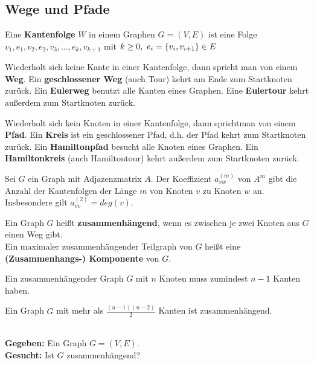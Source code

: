 	\subsection{Wege und Pfade}
	\begin{definition}[Kantenfolge]
		Eine \textbf{Kantenfolge} $W$ in einem Graphen $G = (V, E)$ ist eine Folge $v_1, e_1, v_2, e_2, v_3, ..., e_k, v_{k+1}$ mit $k \ge 0,~e_i = \{v_i, v_{i+1}\} \in E$
	\end{definition}
	\begin{definition}[Weg]
		Wiederholt sich keine Kante in einer Kantenfolge, dann spricht man von einem \textbf{Weg}. Ein \textbf{geschlossener Weg} (auch Tour) kehrt am Ende zum Startknoten zurück. Ein \textbf{Eulerweg} benutzt alle Kanten eines Graphen. Eine \textbf{Eulertour} kehrt außerdem zum Startknoten zurück.
	\end{definition}
	\begin{definition}[Pfad]
		Wiederholt sich kein Knoten in einer Kantenfolge, dann sprichtman von einem \textbf{Pfad}. Ein \textbf{Kreis} ist ein geschlossener Pfad, d.h. der Pfad kehrt zum Startknoten zurück. Ein \textbf{Hamiltonpfad} besucht alle Knoten eines Graphen. Ein \textbf{Hamiltonkreis} (auch Hamiltontour) kehrt außerdem zum Startknoten zurück.
	\end{definition}
	\begin{satz}
		Sei $G$ ein Graph mit Adjazenzmatrix $A$. Der Koeffizient $a_{vw}^{(m)}$ von $A^m$ gibt die Anzahl der Kantenfolgen der Länge $m$ von Knoten $v$ zu Knoten $w$ an. Insbesondere gilt $a_{vv}^{(2)} = deg(v)$.
	\end{satz}
	\begin{definition}[Zusammenhängend]
		Ein Graph $G$ heißt \textbf{zusammenhängend}, wenn es zwischen je zwei Knoten aus $G$ einen Weg gibt.\\[5pt]
		Ein maximaler zusammenhängender Teilgraph von $G$ heißt eine \textbf{(Zusammenhangs-) Komponente} von $G$.
	\end{definition}
	\begin{satz}
		Ein zusammenhängender Graph $G$ mit $n$ Knoten muss zumindest $n - 1$ Kanten haben.
	\end{satz}
	\begin{satz}
		Ein Graph $G$ mit mehr als $\frac{(n-1)(n-2)}{2}$ Kanten ist zusammenhängend.
	\end{satz}
	\begin{problem}[Zusammenhang]~\\[5pt]
		\hspace*{10pt}\textbf{Gegeben: } Ein Graph $G = (V, E)$.\\[5pt]
		\hspace*{10pt}\textbf{Gesucht: } Ist $G$ zusammenhängend?
	\end{problem}
